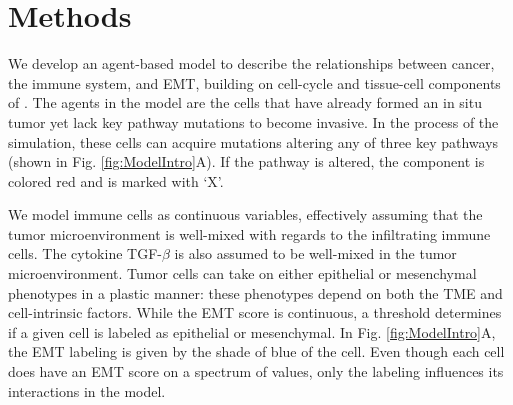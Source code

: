 \documentclass[11pt]{article}
\begin{document}



\section{Methods}
We develop an agent-based model to describe the relationships between cancer, the immune system, and EMT, building on cell-cycle and tissue-cell components of \cite{guo17_multiscale}. 
The agents in the model are the cells that have already formed an in situ tumor yet lack key pathway mutations to become invasive.
In the process of the simulation, these cells can acquire mutations altering any of three key pathways (shown in Fig. \ref{fig:ModelIntro}A).
If the pathway is altered, the component is colored red and is marked with `X'.
\par
We model immune cells as continuous variables, effectively assuming that the tumor microenvironment is well-mixed with regards to the infiltrating immune cells.
The cytokine TGF-$\beta$ is also assumed to be well-mixed in the tumor microenvironment.
Tumor cells can take on either epithelial or mesenchymal phenotypes in a plastic manner: these phenotypes depend on both the TME and cell-intrinsic factors.
While the EMT score is continuous, a threshold determines if a given cell is labeled as epithelial or mesenchymal.
In Fig. \ref{fig:ModelIntro}A, the EMT labeling is given by the shade of blue of the cell.
Even though each cell does have an EMT score on a spectrum of values, only the labeling influences its interactions in the model.
\end{document}
